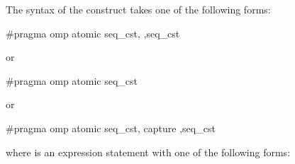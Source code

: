 \ccppspecificstart
The syntax of the  construct takes one of the following forms:

\begin{boxedcode}
\#pragma omp atomic \plc{[}seq\_cst\plc{[},\plc{]]}  \plc{[[},\plc{]}seq\_cst\plc{]} 
\end{boxedcode}


or

\begin{boxedcode}
\#pragma omp atomic \plc{[}seq\_cst\plc{]}  
\end{boxedcode}

or

\begin{boxedcode}
\#pragma omp atomic \plc{[}seq\_cst\plc{[},\plc{]]} capture \plc{[[},\plc{]}seq\_cst\plc{]} 
\end{boxedcode}

where  is an expression statement with one of the following forms:

